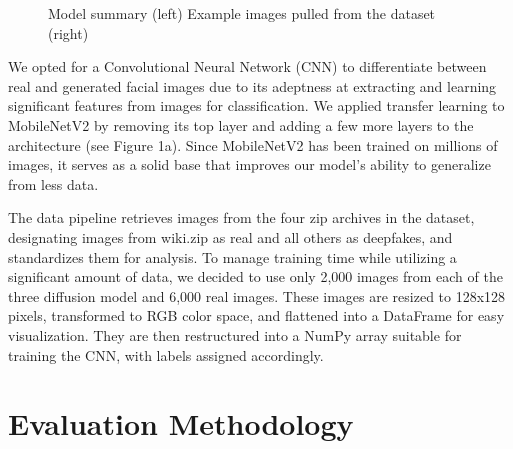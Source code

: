 \documentclass[10pt]{article}
\begin{document}
\begin{figure}[htb!]%
    \centering
    \qquad
    \caption{Model summary (left) Example images pulled from the dataset (right)}%
    \label{fig:example}%
\end{figure}

We opted for a Convolutional Neural Network (CNN) to differentiate between real and generated facial images due to its adeptness at extracting and learning significant features from images for classification. We applied transfer learning to MobileNetV2 by removing its top layer and adding a few more layers to the architecture (see Figure 1a). Since MobileNetV2 has been trained on millions of images, it serves as a solid base that improves our model’s ability to generalize from less data. 

The data pipeline retrieves images from the four zip archives in the dataset, designating images from wiki.zip as real and all others as deepfakes, and standardizes them for analysis. To manage training time while utilizing a significant amount of data, we decided to use only 2,000 images from each of the three diffusion model and 6,000 real images. These images are resized to 128x128 pixels, transformed to RGB color space, and flattened into a DataFrame for easy visualization. They are then restructured into a NumPy array suitable for training the CNN, with labels assigned accordingly. 







\section{Evaluation Methodology}
\end{document}
